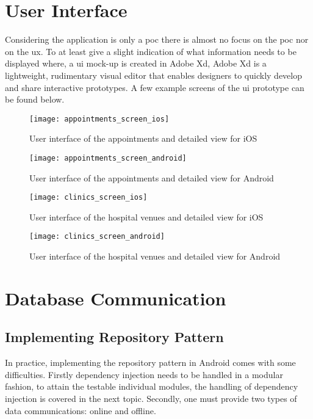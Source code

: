 \section{User Interface}
Considering the application is only a \acrshort{poc} there is almost no focus on the \acrlong{poc} nor on the \acrfull{ux}. To at least give a slight indication of what information needs to be displayed where, a \acrshort{ui} mock-up is created in Adobe Xd, Adobe Xd is a lightweight, rudimentary visual editor that enables designers to quickly develop and share interactive prototypes. A few example screens of the \acrshort{ui} prototype can be found below.
\begin{figure}[H]
\centering
\texttt{[image: appointments\_screen\_ios]}
\caption{User interface of the appointments and detailed view for iOS}
\end{figure}
\begin{figure}[H]
\centering
\texttt{[image: appointments\_screen\_android]}
\caption{User interface of the appointments and detailed view for Android}
\end{figure}
\begin{figure}[H]
\centering
\texttt{[image: clinics\_screen\_ios]}
\caption{User interface of the hospital venues and detailed view for iOS}
\end{figure}
\begin{figure}[H]
\centering
\texttt{[image: clinics\_screen\_android]}
\caption{User interface of the hospital venues and detailed view for Android}
\end{figure}
\section{Database Communication}
\subsection{Implementing Repository Pattern}
In practice, implementing the repository pattern in Android comes with some difficulties. Firstly dependency injection needs to be handled in a modular fashion, to attain the testable individual modules, the handling of dependency injection is covered in the next topic. Secondly, one must provide two types of data communications: online and offline. 
